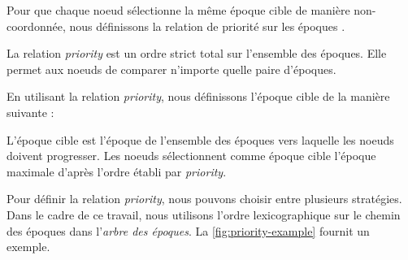 \label{sec:priority}

Pour que chaque noeud sélectionne la même époque cible de manière non-coordonnée, nous définissons la relation de priorité sur les époques \lepoch.

\begin{definition}
  \label{def:priority-relation}
  La relation \emph{priority} \lepoch est un ordre strict total sur l'ensemble des époques.
  Elle permet aux noeuds de comparer n'importe quelle paire d'époques.
\end{definition}

En utilisant la relation \emph{priority}, nous définissons l'époque cible de la manière suivante :

\begin{definition}
  L'époque cible est l'époque de l'ensemble des époques vers laquelle les noeuds doivent progresser.
  Les noeuds sélectionnent comme époque cible l'époque maximale d'après l'ordre établi par \emph{priority}.
\end{definition}

Pour définir la relation \emph{priority}, nous pouvons choisir entre plusieurs stratégies.
Dans le cadre de ce travail, nous utilisons l'ordre lexicographique sur le chemin des époques dans l'\emph{arbre des époques}.
La \autoref{fig:priority-example} fournit un exemple.

